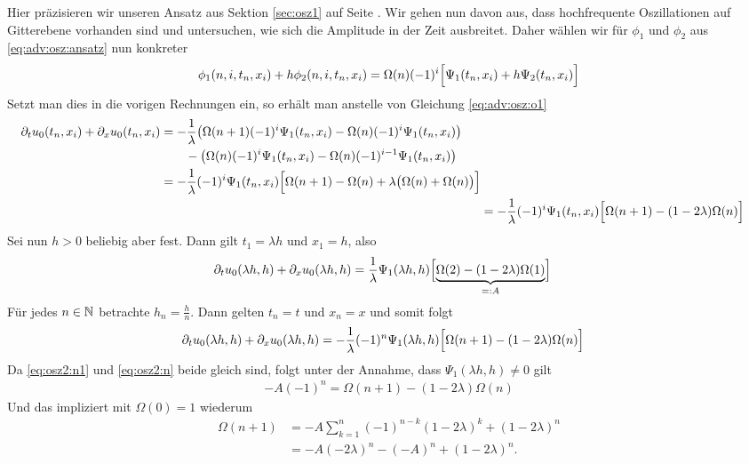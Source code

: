 Hier präzisieren wir unseren Ansatz aus Sektion \ref{sec:osz1} auf Seite \pageref{sec:osz1}.
Wir gehen nun davon aus, dass hochfrequente Oszillationen auf Gitterebene vorhanden sind und untersuchen, wie sich die Amplitude in der Zeit ausbreitet.
Daher wählen wir für $\phi_1$ und $\phi_2$ aus \eqref{eq:adv:osz:ansatz} nun konkreter 
\[ 
\phi_1(n, i, t_n, x_i) + h \phi_2(n, i, t_n, x_i) 
= \Omega(n) (-1)^i \Bigl[ \Psi_1(t_n, x_i) + h \Psi_2(t_n, x_i) \Bigr]
\]
Setzt man dies in die vorigen Rechnungen ein, so erhält man anstelle von Gleichung \eqref{eq:adv:osz:o1}
\begin{align}\label{eq:osz2:o1} \nonumber
\begin{split}
\partial_t u_0(t_n, x_i) + \partial_x u_0(t_n, x_i) &=
- \frac 1 \lambda \bigl( \Omega(n+1) (-1)^i \Psi_1(t_n, x_i) - \Omega(n) (-1)^i \Psi_1(t_n, x_i) \bigr)\\
&\qquad - \bigl( \Omega(n) (-1)^i \Psi_1(t_n, x_i) - \Omega(n) (-1)^{i-1} \Psi_1(t_n, x_i) \bigr)\\
&= - \frac 1 \lambda (-1)^i \Psi_1(t_n, x_i) \Bigl[ \Omega(n+1) - \Omega(n) + \lambda \bigl( \Omega(n) + \Omega(n) \bigr) \Bigr]
\end{split}\\
&= - \frac 1 \lambda (-1)^i \Psi_1(t_n, x_i) \Bigl[ \Omega(n+1) - ( 1 - 2 \lambda ) \Omega(n) \Bigr]
\end{align}
Sei nun $h > 0$ beliebig aber fest. Dann gilt $t_1 = \lambda h$ und $x_1 = h$, also
\begin{align}\label{eq:osz2:n1}
\partial_t u_0(\lambda h, h) + \partial_x u_0(\lambda h, h) &= \frac 1 \lambda \Psi_1(\lambda h, h) \Bigl[ \underbrace{\Omega(2) - ( 1 - 2 \lambda ) \Omega(1)}_{=: A} \Bigr]
\end{align}
Für jedes $n \in \mathbb N$ betrachte $h_n = \frac h n$. Dann gelten $t_n = t$ und $x_n = x$ und somit folgt
\begin{align}\label{eq:osz2:n}
\partial_t u_0(\lambda h, h) + \partial_x u_0(\lambda h, h) &= - \frac 1 \lambda (-1)^n \Psi_1(\lambda h, h) \Bigl[ \Omega(n+1) - ( 1 - 2 \lambda ) \Omega(n) \Bigr]
\end{align}
Da \eqref{eq:osz2:n1} und \eqref{eq:osz2:n} beide gleich sind, folgt unter der Annahme, dass {\color{red}$\Psi_1(\lambda h, h) \neq 0$} gilt
\begin{align}\label{eq:osz:omegan}
-A (-1)^n = \Omega(n+1) - ( 1 - 2 \lambda ) \Omega(n)
\end{align}
Und das impliziert mit {\color{red} $\Omega(0) = 1$} wiederum
\begin{align}\nonumber
\Omega(n+1) &= -A \sum_{k=1}^n (-1)^{n-k} (1 - 2 \lambda)^k + (1 - 2 \lambda)^n\\
&= -A (- 2 \lambda)^n - (-A)^n + (1 - 2 \lambda)^n.
\end{align}
